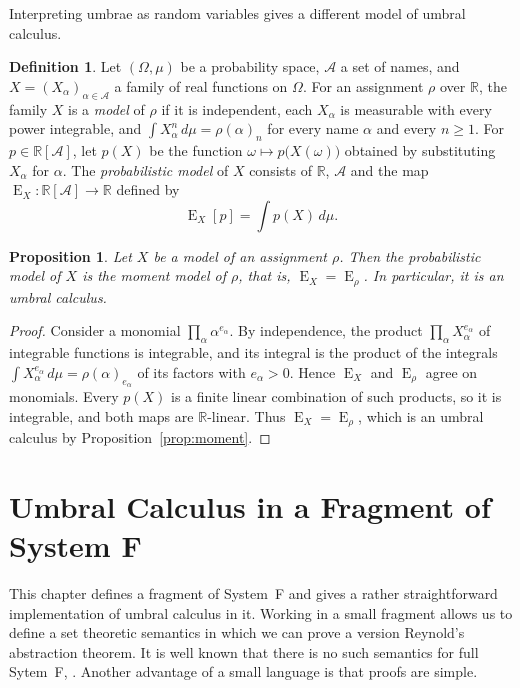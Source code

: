 \documentclass[11pt,a4paper]{report}
\theoremstyle{plain}
\newtheorem{proposition}[theorem]{Proposition}
\theoremstyle{definition}
\newtheorem{definition}[theorem]{Definition}
\theoremstyle{remark}
\newcommand{\E}{\operatorname{E}}
\newcommand{\RR}{\mathbb{R}}
\begin{document}
Interpreting umbrae as random variables gives a different model of umbral calculus.

\begin{definition}
\label{def:probmodel}
Let $(\Omega, \mu)$ be a probability space, $\mathcal{A}$ a set of names, and
$X = (X_\alpha)_{\alpha \in \mathcal{A}}$ a family of real functions on $\Omega$.
For an assignment $\rho$ over $\RR$, the family $X$ is a \emph{model} of $\rho$ if
it is independent, each $X_\alpha$ is measurable with every power integrable, and
$\int X_\alpha^n\, d\mu = \rho(\alpha)_n$ for every name $\alpha$ and every
$n \geq 1$. For $p \in \RR[\mathcal{A}]$, let $p(X)$ be the function
$\omega \mapsto p\bigl(X(\omega)\bigr)$ obtained by substituting $X_\alpha$ for
$\alpha$. The \emph{probabilistic model} of $X$ consists of $\RR$, $\mathcal{A}$
and the map $\E_X : \RR[\mathcal{A}] \to \RR$ defined by
\[
  \E_X[p] = \int p(X)\, d\mu .
\]
\end{definition}

\begin{proposition}
\label{prop:probmodel}
Let $X$ be a model of an assignment $\rho$. Then the probabilistic model of $X$ is
the moment model of $\rho$, that is, $\E_X = \E_\rho$. In particular, it is an
umbral calculus.
\end{proposition}

\begin{proof}
Consider a monomial $\prod_\alpha \alpha^{e_\alpha}$. By independence, the
product $\prod_\alpha X_\alpha^{e_\alpha}$ of integrable functions is integrable,
and its integral is the product of the integrals
$\int X_\alpha^{e_\alpha}\, d\mu = \rho(\alpha)_{e_\alpha}$ of its factors with
$e_\alpha > 0$. Hence $\E_X$ and $\E_\rho$ agree on monomials. Every $p(X)$ is a
finite linear combination of such products, so it is integrable, and both maps
are $\RR$-linear. Thus $\E_X = \E_\rho$, which is an umbral calculus by
Proposition~\ref{prop:moment}.
\end{proof}

\chapter{Umbral Calculus in a Fragment of System F}
\label{ch:restricted}

This chapter defines a fragment of System~F and gives a rather straightforward implementation 
of umbral calculus in it. Working in a small fragment allows us to define a set theoretic 
semantics in which we can prove a version Reynold's abstraction theorem. It is well known 
that there is no such semantics for full Sytem~F, \cite{Reynolds1984}. Another advantage of 
a small language is that proofs are simple.
\end{document}
